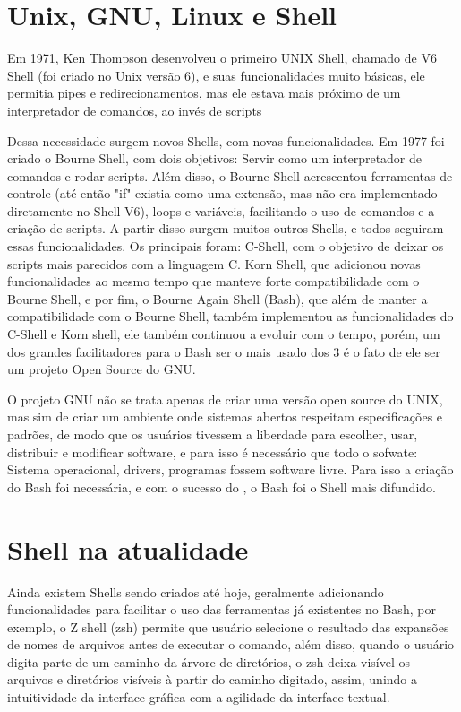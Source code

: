 \documentclass[oneside, 11 pt]{article}
\begin{document}
	\section{Unix, GNU, Linux e Shell}
	Em 1971, Ken Thompson desenvolveu o primeiro UNIX Shell, chamado de V6 Shell (foi criado no Unix versão 6), e suas funcionalidades muito básicas, ele permitia pipes e redirecionamentos, mas ele estava mais próximo de um interpretador de comandos, ao invés de scripts\par
	Dessa necessidade surgem novos Shells, com novas funcionalidades. Em 1977 foi criado o Bourne Shell, com dois objetivos: Servir como um interpretador de comandos e rodar scripts. Além disso, o Bourne Shell acrescentou ferramentas de controle (até então "if" existia como uma extensão, mas não era implementado diretamente no Shell V6), loops e variáveis, facilitando o uso de comandos e a criação de scripts. A partir disso surgem muitos outros Shells, e todos seguiram essas funcionalidades. Os principais foram: C-Shell, com o objetivo de deixar os scripts mais parecidos com a linguagem C. Korn Shell, que adicionou novas funcionalidades ao mesmo tempo que manteve forte compatibilidade com o Bourne Shell, e por fim, o Bourne Again Shell (Bash), que além de manter a compatibilidade com o Bourne Shell, também implementou as funcionalidades do C-Shell e Korn shell, ele também continuou a evoluir com o tempo, porém, um dos grandes facilitadores para o Bash ser o mais usado dos 3 é o fato de ele ser um projeto Open Source do GNU. \par
	O projeto GNU não se trata apenas de criar uma versão open source do UNIX, mas sim de criar um ambiente onde sistemas abertos respeitam especificações e padrões, de modo que os usuários tivessem a liberdade para escolher, usar, distribuir e modificar software, e para isso é necessário que todo o sofwate: Sistema operacional, drivers, programas fossem software livre. Para isso a criação do Bash foi necessária, e com o sucesso do \cite{gnu}, o Bash foi o Shell mais difundido.
	\section{Shell na atualidade}
	Ainda existem Shells sendo criados até hoje, geralmente adicionando funcionalidades para
	facilitar o uso das ferramentas já existentes no Bash, por exemplo, o Z shell (zsh) permite
	que usuário selecione o resultado das expansões de nomes de arquivos antes de executar o
	comando, além disso, quando o usuário digita parte de um caminho da árvore de diretórios,
	o zsh deixa visível os arquivos e diretórios visíveis à partir do caminho digitado, assim,
	unindo a intuitividade da interface gráfica com a agilidade da interface textual.
	
\end{document}
